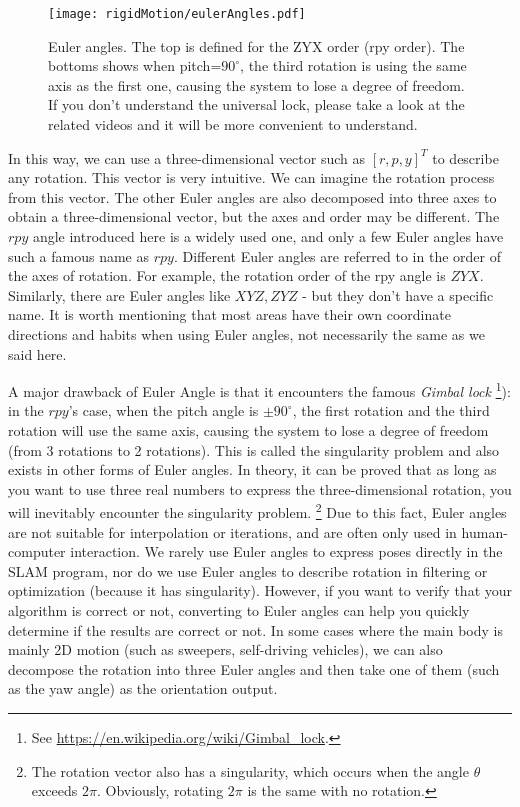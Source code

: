 \begin{figure}[!t]
    \centering
    \texttt{[image: rigidMotion/eulerAngles.pdf]}
    \caption{Euler angles. The top is defined for the ZYX order (rpy order). The bottoms shows when pitch=$90^\circ$, the third rotation is using the same axis as the first one, causing the system to lose a degree of freedom. If you don't understand the universal lock, please take a look at the related videos and it will be more convenient to understand. }
    \label{fig:eulerAngles}
\end{figure}

In this way, we can use a three-dimensional vector such as $[r,p,y]^T$ to describe any rotation. This vector is very intuitive. We can imagine the rotation process from this vector. The other Euler angles are also decomposed into three axes to obtain a three-dimensional vector, but the axes and order may be different. The $rpy$ angle introduced here is a widely used one, and only a few Euler angles have such a famous name as $rpy$. Different Euler angles are referred to in the order of the axes of rotation. For example, the rotation order of the rpy angle is $ZYX$. Similarly, there are Euler angles like $XYZ, ZYZ$ - but they don't have a specific name. It is worth mentioning that most areas have their own coordinate directions and habits when using Euler angles, not necessarily the same as we said here.

A major drawback of Euler Angle is that it encounters the famous \textit{Gimbal lock} \footnote{See \url{https://en.wikipedia.org/wiki/Gimbal_lock}.}): in the $rpy$'s case, when the pitch angle is $\pm 90 ^\circ $, the first rotation and the third rotation will use the same axis, causing the system to lose a degree of freedom (from 3 rotations to 2 rotations). This is called the singularity problem and also exists in other forms of Euler angles. In theory, it can be proved that as long as you want to use three real numbers to express the three-dimensional rotation, you will inevitably encounter the singularity problem. \footnote{The rotation vector also has a singularity, which occurs when the angle $\theta$ exceeds $2\pi$. Obviously, rotating $2\pi$ is the same with no rotation.} Due to this fact, Euler angles are not suitable for interpolation or iterations, and are often only used in human-computer interaction. We rarely use Euler angles to express poses directly in the SLAM program, nor do we use Euler angles to describe rotation in filtering or optimization (because it has singularity). However, if you want to verify that your algorithm is correct or not, converting to Euler angles can help you quickly determine if the results are correct or not. In some cases where the main body is mainly 2D motion (such as sweepers, self-driving vehicles), we can also decompose the rotation into three Euler angles and then take one of them (such as the yaw angle) as the orientation output.

